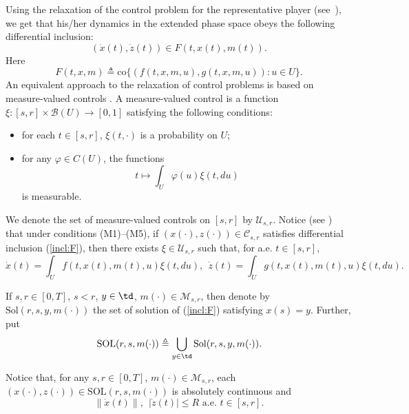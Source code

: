 \documentclass[a4paper,12pt]{article}
\begin{document}
Using the relaxation of the control problem for the representative player (see~\cite{Warga}), we get that his/her dynamics in the extended phase space obeys the following differential inclusion:
\begin{equation}\label{incl:F}
(\dot{x}(t),\dot{z}(t))\in F(t,x(t),m(t)).  
\end{equation} Here
\begin{equation}\label{intro:F}
F(t,x,m)\triangleq \mathrm{co}\{(f(t,x,m,u),g(t,x,m,u)):u\in U\}.
\end{equation}
An equivalent approach to the relaxation of control problems is based on measure-valued controls \cite{Warga}. 
A measure-valued control is a function $\xi:[s,r]\times\mathcal{B}(U)\rightarrow [0,1]$ satisfying the following conditions:
\begin{itemize}
	\item for each $t\in [s,r]$, $\xi(t,\cdot)$ is a probability on $U$;
	\item for any $\varphi\in C(U)$, the functions $$t\mapsto\int_U\varphi(u)\xi(t,du)$$ is measurable.
\end{itemize} We denote the set of measure-valued controls on $[s,r]$ by $\mathcal{U}_{s,r}$. Notice (see \cite{Warga}) that under conditions (M1)--(M5), if $(x(\cdot),z(\cdot))\in \mathcal{C}_{s,r}$ satisfies differential inclusion (\ref{incl:F}), then there exists $\xi\in\mathcal{U}_{s,r}$ such that, for a.e. $t\in [s,r]$,
\begin{equation}\label{eq:xi_F}
\dot{x}(t)= \int_U f(t,x(t),m(t),u)\xi(t,du),\ \ \dot{z}(t)= \int_U g(t,x(t),m(t),u)\xi(t,du).
\end{equation}



If $s,r\in [0,T]$, $s<r$, $y\in \td$, $m(\cdot)\in\mathcal{M}_{s,r}$, then denote by $\mathrm{Sol}(r,s,y,m(\cdot))$ the set of solution of (\ref{incl:F}) satisfying $x(s)=y$.
Further, put
\begin{equation}\label{introl:SOL}
\mathrm{SOL}(r,s,m(\cdot))\triangleq \bigcup_{y\in\td}\mathrm{Sol}(r,s,y,m(\cdot)). 
\end{equation}

Notice that, for any $s,r\in [0,T]$, $m(\cdot)\in \mathcal{M}_{s,r}$, each $(x(\cdot),z(\cdot))\in\mathrm{SOL}(r,s,m(\cdot))$ is absolutely continuous and 
\begin{equation}\label{estima:dot_x_dot_z}
\|\dot{x}(t)\|,\ \ |\dot{z}(t)|\leq R\mbox{ a.e. }t\in [s,r].
\end{equation} 
\end{document}
